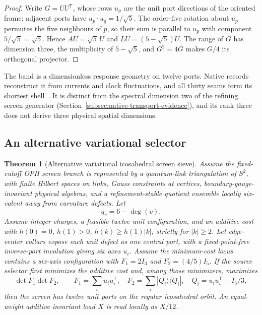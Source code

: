 \documentclass[11pt]{article}
\newtheorem{theorem}{Theorem}[section]
\theoremstyle{remark}
\theoremstyle{plain}
\begin{document}
\begin{proof}
Write \(G=UU^{\mathsf T}\), whose rows \(u_p\) are the unit port directions of
the oriented frame; adjacent ports have \(u_p\cdot u_q=1/\sqrt5\). The
order-five rotation about \(u_p\) permutes the five neighbours of \(p\), so
their sum is parallel to \(u_p\) with component \(5/\sqrt5=\sqrt5\). Hence
\(AU=\sqrt5\,U\) and \(LU=(5-\sqrt5)U\). The range of \(G\) has dimension
three, the multiplicity of \(5-\sqrt5\), and \(G^2=4G\) makes \(G/4\) its
orthogonal projector.
\end{proof}

The band is a dimensionless response geometry on twelve ports. Native
records reconstruct it from currents and clock fluctuations, and all thirty
seams form its shortest shell~\cite{ophmodel}. It is distinct from the
spectral dimension two of the refining screen generator
(Section~\ref{subsec:native-transport-evidence}), and its rank three does not
derive three physical spatial dimensions.

\subsection{An alternative variational selector}

\begin{theorem}[Alternative variational icosahedral screen sieve]\label{thm:icosahedral-screen-sieve}
Assume the fixed-cutoff OPH screen branch is represented by a quantum-link
triangulation of \(S^2\), with finite Hilbert spaces on links, Gauss constraints
at vertices, boundary-gauge-invariant physical algebras, and a refinement-stable
quotient ensemble locally six-valent away from curvature defects. Let
\[
q_v=6-\deg(v).
\]
Assume integer charges, a feasible twelve-unit configuration, and an additive
cost with \(h(0)=0\), \(h(1)>0\), \(h(k)\ge h(1)|k|\), strictly for
\(|k|\ge2\). Let edge-center collars expose each unit defect as one central
port, with a fixed-point-free inverse-port involution giving six axes \(u_i\).
Assume the minimum-cost locus contains a six-axis configuration with
\(F_1=2I_3\) and \(F_2=(4/5)I_5\).  If the source selector first minimizes the
additive cost and, among those minimizers, maximizes
\[
 \det F_1\det F_2,\qquad
 F_1=\sum_i u_iu_i^{\mathsf T},\quad
 F_2=\sum_i|Q_i\rangle\langle Q_i|,\quad
 Q_i=u_iu_i^{\mathsf T}-I_3/3,
\]
then the screen has twelve unit ports on the regular icosahedral orbit. An
equal-weight additive invariant load \(X\) is read locally as \(X/12\).
\end{theorem}
\end{document}
